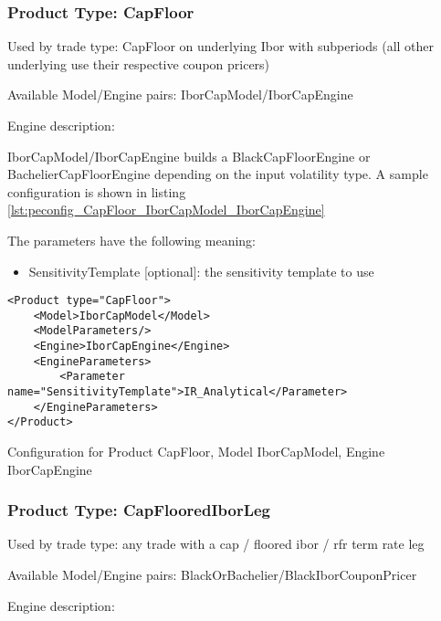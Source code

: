 \subsubsection{Product Type: CapFloor}

Used by trade type: CapFloor on underlying Ibor with subperiods (all other underlying use their respective coupon pricers)

Available Model/Engine pairs: IborCapModel/IborCapEngine

Engine description:

IborCapModel/IborCapEngine builds a BlackCapFloorEngine or BachelierCapFloorEngine depending on the input volatility
type. A sample configuration is shown in listing \ref{lst:peconfig_CapFloor_IborCapModel_IborCapEngine}

The parameters have the following meaning:

\begin{itemize}
\item SensitivityTemplate [optional]: the sensitivity template to use 
\end{itemize}

\begin{longlisting}
\begin{verbatim}
<Product type="CapFloor">
    <Model>IborCapModel</Model>
    <ModelParameters/>
    <Engine>IborCapEngine</Engine>
    <EngineParameters>
        <Parameter name="SensitivityTemplate">IR_Analytical</Parameter>
    </EngineParameters>
</Product>
\end{verbatim}
\caption{Configuration for Product CapFloor, Model IborCapModel, Engine IborCapEngine}
\label{lst:peconfig_CapFloor_IborCapModel_IborCapEngine}
\end{longlisting}

\subsubsection{Product Type: CapFlooredIborLeg}

Used by trade type: any trade with a cap / floored ibor / rfr term rate leg

Available Model/Engine pairs: BlackOrBachelier/BlackIborCouponPricer

Engine description:

